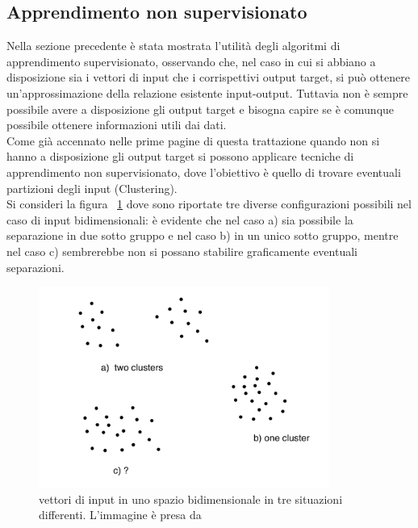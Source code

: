 \newpage

\subsection{Apprendimento non supervisionato}
\label{app_non_sup}

Nella sezione precedente è stata mostrata l'utilità degli algoritmi di apprendimento supervisionato, osservando che, nel caso in cui si abbiano a disposizione sia i vettori di input che i corrispettivi output target, si può ottenere un'approssimazione della relazione esistente input-output.
Tuttavia non è sempre possibile avere a disposizione gli output target e bisogna capire se è comunque possibile ottenere informazioni utili dai dati. \\
Come già accennato nelle prime pagine di questa trattazione quando non si hanno a disposizione gli output target si possono applicare tecniche di apprendimento non supervisionato, dove l'obiettivo è quello di trovare eventuali partizioni degli input (Clustering). \\
Si consideri la figura ~\ref{Unsup} dove sono riportate tre diverse configurazioni possibili nel caso di input bidimensionali: è evidente che nel caso a) sia possibile la separazione in due sotto gruppo e nel caso b) in un unico sotto gruppo, mentre nel caso c) sembrerebbe non si possano stabilire graficamente eventuali separazioni.

\begin{figure}[h!]
	\centering
	\includegraphics[width=0.85\textwidth]{figs/Unsup_learning.png}
	\caption{vettori di input in uno spazio bidimensionale in tre situazioni differenti. L'immagine è presa da \cite{IntroML}}
	\label{Unsup}
\end{figure}

